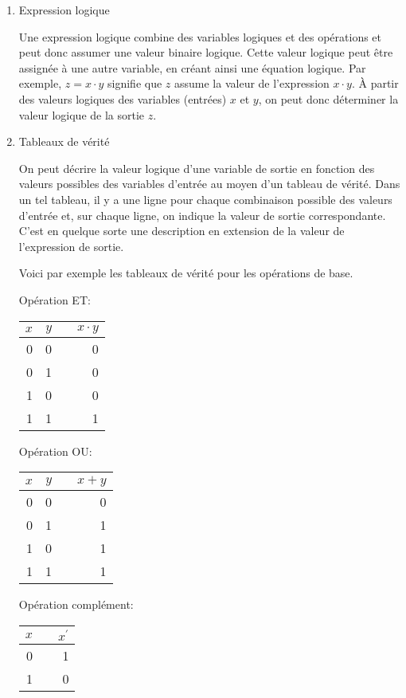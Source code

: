 \documentclass[letter, oneside]{book}
\begin{document}
\begin{enumerate}
\item Expression logique
\label{sec:orge47126c}

Une expression logique combine des variables logiques et des
opérations et peut donc assumer une valeur binaire logique. Cette
valeur logique peut être assignée à une autre variable, en créant
ainsi une équation logique. Par exemple, \(z = x \cdot y\) signifie
que \(z\) assume la valeur de l'expression \(x \cdot y\). À partir des
valeurs logiques des variables (entrées) \(x\) et \(y\), on peut donc
déterminer la valeur logique de la sortie \(z\).

\item Tableaux de vérité
\label{sec:org0879349}

On peut décrire la valeur logique d'une variable de sortie en
fonction des valeurs possibles des variables d'entrée au moyen
d'un tableau de vérité. Dans un tel tableau, il y a une ligne pour
chaque combinaison possible des valeurs d'entrée et, sur chaque ligne,
on indique la valeur de sortie correspondante. C'est en quelque sorte
une description en extension de la valeur de l'expression de sortie.

Voici par exemple les tableaux de vérité pour les opérations de base.

Opération ET:

\begin{center}
\begin{tabular}{rrlr}
\(x\) & \(y\) &  & \(x \cdot y\)\\[0pt]
\hline
0 & 0 &  & 0\\[0pt]
0 & 1 &  & 0\\[0pt]
1 & 0 &  & 0\\[0pt]
1 & 1 &  & 1\\[0pt]
\end{tabular}
\end{center}

Opération OU:

\begin{center}
\begin{tabular}{rrlr}
\(x\) & \(y\) &  & \(x + y\)\\[0pt]
\hline
0 & 0 &  & 0\\[0pt]
0 & 1 &  & 1\\[0pt]
1 & 0 &  & 1\\[0pt]
1 & 1 &  & 1\\[0pt]
\end{tabular}
\end{center}

Opération complément:

\begin{center}
\begin{tabular}{rlr}
\(x\) &  & \(x^{\prime}\)\\[0pt]
\hline
0 &  & 1\\[0pt]
1 &  & 0\\[0pt]
\end{tabular}
\end{center}
\end{enumerate}
\end{document}
